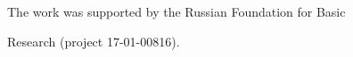  


 












 \Ack


 \noindent


 The work was supported by the Russian Foundation for Basic 


Research (project 17-01-00816).


 








\vspace*{6pt}





